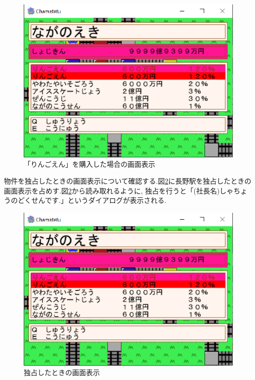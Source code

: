 \documentclass[a4j]{jarticle}
\begin{document}
        \begin{figure}[H]
        \centering
        \includegraphics[scale=1.3]{ringo.eps}
        \caption{「りんごえん」を購入した場合の画面表示}
         \label{ringo}
        \end{figure} 

    物件を独占したときの画面表示について確認する.図\ref{dokusen}に長野駅を独占したときの画面表示を占めす.図\ref{dokusen}から読み取れるように,
    独占を行うと「(社長名)しゃちょうのどくせんです.」というダイアログが表示される.

    \begin{figure}[H]
        \centering
        \includegraphics[scale=1.3]{ringo.eps}
        \caption{独占したときの画面表示}
         \label{dokusen}
        \end{figure} 
\end{document}
